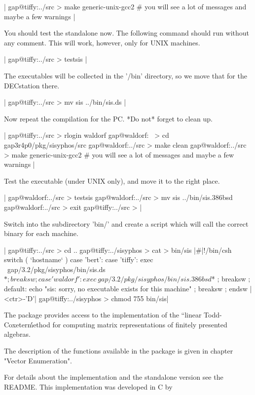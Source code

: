 |    gap@tiffy:../src > make generic-unix-gcc2
    # you will see a lot of messages and maybe a few warnings |

You should test the standalone now.  The following command should run
without any comment.  This will work, however, only for UNIX machines.

|    gap@tiffy:../src > testsis |

The executables will be collected in the '/bin' directory, so we move that
for the DECstation there.

|    gap@tiffy:../src > mv sis ../bin/sis.ds |

Now repeat the compilation  for the PC. *Do not* forget to clean up.

|    gap@tiffy:../src > rlogin waldorf
    gap@waldorf:~ > cd gap3r4p0/pkg/sisyphos/src
    gap@waldorf:../src > make clean
    gap@waldorf:../src > make generic-unix-gcc2
    # you will see a lot of messages and maybe a few warnings |

Test the executable (under UNIX only), and move it to the right place.

|    gap@waldorf:../src > testsis
    gap@waldorf:../src > mv sis ../bin/sis.386bsd
    gap@waldorf:../src > exit
    gap@tiffy:../src > |

Switch into the subdirectory  'bin/' and create a script  which will call
the correct binary for each machine.

|    gap@tiffy:../src > cd ..
    gap@tiffy:../sisyphos > cat > bin/sis
    |\#|!/bin/csh
    switch ( `hostname` )
      case 'bert':
      case 'tiffy':
        exec ~gap/3.2/pkg/sisyphos/bin/sis.ds $* ;
        breaksw ;
      case 'waldorf':
        exec ~gap/3.2/pkg/sisyphos/bin/sis.386bsd $* ;
        breaksw ;
      default:
        echo "sis: sorry, no executable exists for this machine" ;
        breaksw ;
    endsw
    |<ctr>-'D'|
    gap@tiffy:../sisyphos > chmod 755 bin/sis|


The {\VE} package provides access to the implementation of the ``linear
Todd-Coxeter\'\' method for computing matrix representations of finitely
presented algebras.

The description of the functions available in the {\VE} package is
given in chapter "Vector Enumeration".

For  details about  the implementation and the standalone version see the
README. This implementation was developed in C by

